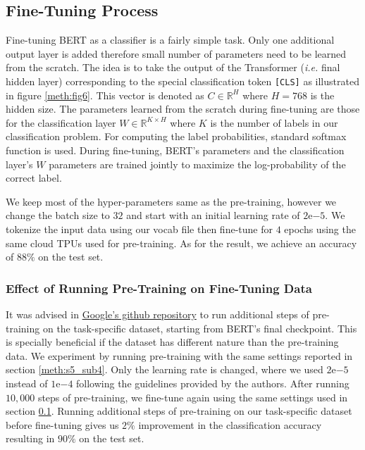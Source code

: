 \subsection{Fine-Tuning Process}
\label{meth:s5_sub6}


Fine-tuning \ac{BERT} as a classifier is a fairly simple task. Only one additional output layer is added therefore small number of parameters need to be learned from the scratch. The idea is to take the output of the Transformer (\textit{i.e.} final hidden layer) corresponding to the special classification token \texttt{[CLS]} as illustrated in figure \ref{meth:fig6}. This vector is denoted as $C \in {\mathbb{R}}^{H}$ where $H=768$ is the hidden size. The parameters learned from the scratch during fine-tuning are those for the classification layer $W \in {\mathbb{R}}^{K\times H} $ where $K$ is the number of labels in our classification problem. For computing the label probabilities, standard softmax function is used. During fine-tuning, \ac{BERT}'s parameters and the classification layer's $W$ parameters are trained jointly to maximize the log-probability of the correct label.

We keep most of the hyper-parameters same as the pre-training, however we change the batch size to $32$ and start with an initial learning rate of $2\mathrm{e}{-5}$. We tokenize the input data using our vocab file then fine-tune for $4$ epochs using the same cloud \ac{TPU}s used for pre-training. As for the result, we achieve an accuracy of $88\%$ on the test set.


\subsubsection{Effect of Running Pre-Training on Fine-Tuning Data}
\label{meth:s5_sub6_subsub1}

It was advised in \href{https://github.com/google-research/bert#pre-training-tips-and-caveats}{Google's github repository} to run additional steps of pre-training on the task-specific dataset, starting from \ac{BERT}'s final checkpoint. This is specially beneficial if the dataset has different nature than the pre-training data. We experiment by running pre-training with the same settings reported in section \ref{meth:s5_sub4}. Only the learning rate is changed, where we used $2\mathrm{e}{-5}$ instead of $1\mathrm{e}{-4}$ following the guidelines provided by the authors. After running $10,000$ steps of pre-training, we fine-tune again using the same settings used in section \ref{meth:s5_sub6}. Running additional steps of pre-training on our task-specific dataset before fine-tuning gives us $2\%$ improvement in the classification accuracy resulting in $90\%$ on the test set.
